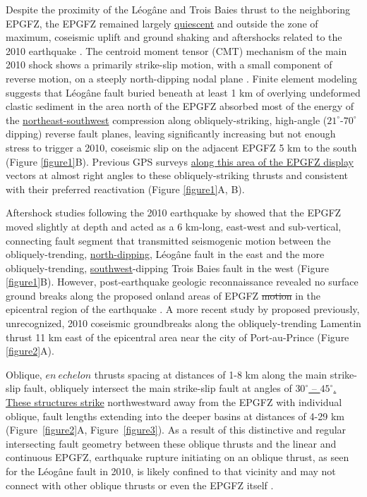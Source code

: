 \documentclass[linenumbers,draft]{agujournal}
\begin{document}
Despite the proximity of the L\'eog\^ane and Trois Baies thrust to the neighboring EPGFZ, the EPGFZ remained largely \ul{quiescent} and outside the zone of maximum, coseismic uplift and ground shaking and aftershocks related to the 2010 earthquake \citep{nettles2010earthquake}. The centroid moment tensor (CMT) mechanism of the main 2010 shock shows a primarily strike-slip motion, with a small component of reverse motion, on a steeply north-dipping nodal plane \citep{nettles2010earthquake,douilly2013crustal}. Finite element modeling \citep{douilly2015three} suggests that L\'eog\^ane fault buried beneath at least 1 km of overlying undeformed clastic sediment in the area north of the EPGFZ absorbed most of the energy of the \ul{northeast-southwest} compression along obliquely-striking, high-angle ($21^{\circ}$-$70^{\circ}$ dipping) reverse fault planes, leaving significantly increasing but not enough stress to trigger a 2010, coseismic slip on the adjacent EPGFZ 5 km to the south (Figure \ref{figure1}B). Previous GPS surveys \underline{\citep{calais2010transpressional,calais2016plate}}\ul{ along this area of the EPGFZ display} vectors at almost right angles to these obliquely-striking thrusts and consistent with their preferred reactivation (Figure \ref{figure1}A, B).

Aftershock studies following the 2010 earthquake by \citet{douilly2013crustal,douilly2015three} showed that the EPGFZ moved slightly at depth and acted as a 6 km-long, east-west and sub-vertical, connecting fault segment that transmitted seismogenic motion between the obliquely-trending, \ul{north-dipping}, L\'eog\^ane fault in the east and the more obliquely-trending, \ul{southwest}-dipping Trois Baies fault in the west (Figure \ref{figure1}B). However, post-earthquake geologic reconnaissance revealed no surface ground breaks along the proposed onland areas of EPGFZ \st{motion} in the epicentral region of the earthquake \citep{prentice2010seismic,koehler2011field,rathje2014geotechnical}. A more recent study by \citet{saint2015seismotectonics} proposed previously, unrecognized, 2010 coseismic groundbreaks along the obliquely-trending Lamentin thrust 11 km east of the epicentral area near the city of Port-au-Prince (Figure \ref{figure2}A).

Oblique, $en~echelon$ thrusts spacing at distances of 1-8 km along the main strike-slip fault, obliquely intersect the main strike-slip fault at angles of \ul{$30^{\circ}$ -- $45^{\circ}$. These structures strike} northwestward away from the EPGFZ with individual oblique, fault lengths extending into the deeper basins at distances of 4-29 km (Figure~\ref{figure2}A, Figure~\ref{figure3}).  As a result of this distinctive and regular intersecting fault geometry between these oblique thrusts and the linear and continuous EPGFZ, earthquake rupture initiating on an oblique thrust, as seen for the L\'eog\^ane fault in 2010, is likely confined to that vicinity and may not connect with other oblique thrusts or even the EPGFZ itself \citep{douilly2013crustal,douilly2015three}.
\end{document}
